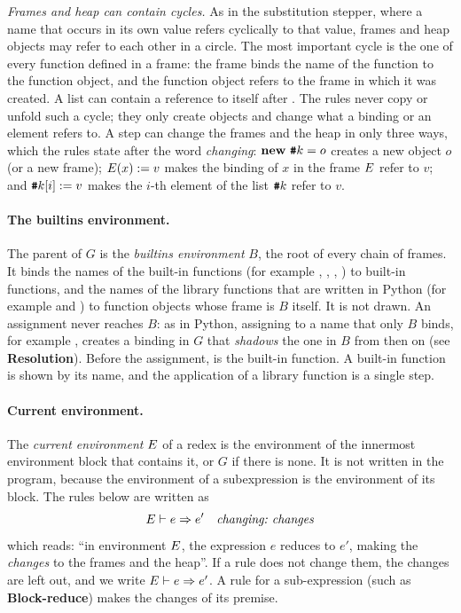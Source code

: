 \emph{Frames and heap can contain cycles.} As in the substitution stepper, where a
name that occurs in its own value refers cyclically to that value, frames and
heap objects may refer to each other in a circle. The most important cycle is
the one of every function defined in a frame: the frame binds the name of the
function to the function object, and the function object refers to the frame in
which it was created. A list can contain a reference to itself after
. The rules never copy or unfold such a cycle; they only
create objects and change what a binding or an element refers to.
A step can change the frames and the heap in only three ways, which the rules
state after the word \emph{changing}: $\mathbf{new}\ \textbf{\texttt{\#}}k = o$ creates a new
object $o$ (or a new frame); $E(x) := v$ makes the binding of $x$ in the
frame $E$ refer to $v$; and $\textbf{\texttt{\#}}k[i] := v$ makes the $i$-th element of
the list $\textbf{\texttt{\#}}k$ refer to $v$.

\paragraph{The builtins environment.} The parent of $G$ is the
\emph{builtins environment} $B$, the root of every chain of frames. It binds
the names of the built-in functions (for example , ,
, ) to built-in functions, and the names of the library
functions that are written in Python (for example  and
) to function objects whose frame is $B$ itself. It is not drawn.
An assignment never reaches $B$: as in Python, assigning to a name that only
$B$ binds, for example , creates a binding in $G$ that
\emph{shadows} the one in $B$ from then on (see \textbf{Resolution}). Before the
assignment,  is the built-in function. A built-in function is shown
by its name, and the application of a library function is a single step.

\paragraph{Current environment.} The \emph{current environment} $E$ of a
redex is the environment of the innermost environment block that contains
it, or $G$ if there is none. It is not written in the program, because the
environment of a subexpression is the environment of its block. The rules
below are written as
\[
  E \vdash e \Rightarrow e' \quad\textnormal{\emph{changing:}}\ \mathit{changes}
\]
which reads: ``in environment $E$, the expression $e$ reduces to $e'$,
making the \emph{changes} to the frames and the heap''. If a rule does not change them,
the changes are left out, and we write $E \vdash e \Rightarrow e'$. A rule for a
sub-expression (such as \textbf{Block-reduce}) makes the changes of its premise.

